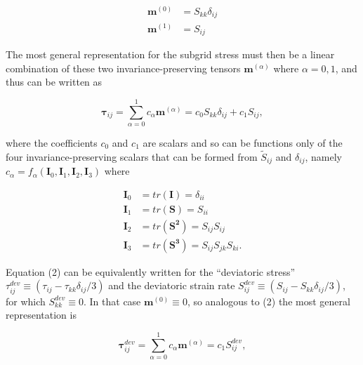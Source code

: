 %
\begin{subequations}
\begin{align}
	\label{E:18}
		\mathbf{m}^{(0)} &= S_{kk}\delta_{ij} \\
		\mathbf{m}^{(1)} &= S_{ij}
\end{align}
\end{subequations}
%
%        

The most general representation for the subgrid stress must then be a linear combination of these two invariance-preserving tensors $\mathbf{m}^{(\alpha)}$  where $\alpha = 0,1$, and thus can be written as 

%
\begin{equation}
	\label{E:19}
		\mathbf{\tau}_{ij} = \sum_{\alpha=0}^{1} c_{\alpha} \mathbf{m}^{(\alpha)}
		= c_0 S_{kk} \delta_{ij} + c_1 S_{ij},
\end{equation}
%
%        

where the coefficients $c_0$  and $c_1$  are scalars and so can be functions only of the four invariance-preserving scalars that can be formed from  $\widetilde{S}_{ij}$ and $\delta_{ij}$, namely  $c_{\alpha} = f_{\alpha} (\mathbf{I}_0, \mathbf{I}_1, \mathbf{I}_2,
\mathbf{I}_3)$ where 

%
\begin{subequations}
\begin{align}
	\label{E:20}
		\mathbf{I}_{0} &= tr(\mathbf{I})   = \delta_{ii} \\
		\mathbf{I}_{1} &= tr(\mathbf{S})   = S_{ii} \\
		\mathbf{I}_{2} &= tr(\mathbf{S^2}) = S_{ij}S_{ij} \\
		\mathbf{I}_{3} &= tr(\mathbf{S^3}) = S_{ij}S_{jk}S_{ki}. 
\end{align}
\end{subequations}
%
%    

Equation (2) can be equivalently written for the ``deviatoric stress''  $\tau_{ij}^{dev} \equiv (\tau_{ij} - \tau_{kk}\delta_{ij}/3)$ and the deviatoric strain rate  $S_{ij}^{dev} \equiv (S_{ij} - S_{kk}\delta_{ij}/3)$, for which $S_{kk}^{dev} \equiv 0$. In that case $\mathbf{m}^{(0)} \equiv 0$, so analogous to (2) the most general representation is

%
\begin{equation}
	\label{E:21}
		\mathbf{\tau}_{ij}^{dev} = \sum_{\alpha=0}^{1} c_{\alpha} \mathbf{m}^{(\alpha)}
		= c_1 S_{ij}^{dev},
\end{equation}
%
%     

